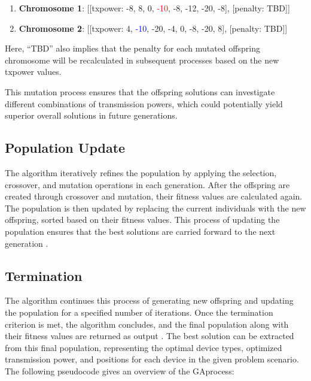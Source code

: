 \begin{enumerate}
    \item \textbf{Chromosome 1}: [[txpower: -8, 8, 0, \textcolor{red}{-10}, -8, -12, -20, -8], [penalty: TBD]]
    \item \textbf{Chromosome 2}: [[txpower: 4, \textcolor{blue}{-10}, -20, -4, 0, -8, -20, 8], [penalty: TBD]]
\end{enumerate}

Here, ``TBD'' also implies that the penalty for each mutated offspring chromosome will be recalculated in subsequent processes based on the new txpower values.

This mutation process ensures that the offspring solutions can investigate different combinations of transmission powers, which could potentially yield superior overall solutions in future generations.

\subsection{Population Update}

The algorithm iteratively refines the population by applying the selection, crossover, and mutation operations in each generation. After the offspring are created through crossover and mutation, their fitness values are calculated again. The population is then updated by replacing the current individuals with the new offspring, sorted based on their fitness values. This process of updating the population ensures that the best solutions are carried forward to the next generation \cite{lambora2019genetic}.


\subsection{Termination}

The algorithm continues this process of generating new offspring and updating the population for a specified number of iterations. Once the termination criterion is met, the algorithm concludes, and the final population along with their fitness values are returned as output \cite{lambora2019genetic}. The best solution can be extracted from this final population, representing the optimal device types, optimized transmission power, and positions for each device in the given problem scenario. The following pseudocode gives an overview of the \acrlong{GA}process:

